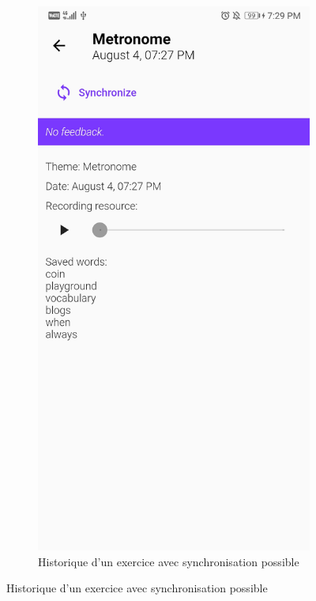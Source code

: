 \begin{appendices}
\begin{landscape}
\begin{figure}[h]
\begin{subfigure}{.25\textwidth}
    \includegraphics[width=.75\linewidth]{content/imgs/screen12.jpg}
    \caption{Historique d'un exercice avec synchronisation possible}
    \label{appendix:screen_sync}
  \end{subfigure}
\end{figure}



\end{landscape}
\end{appendices}
